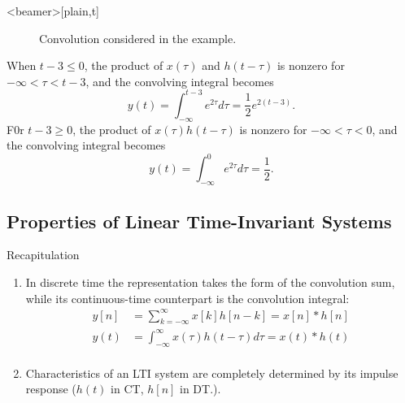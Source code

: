\begin{frame}<beamer>[plain,t]
    {
    \begin{figure}
      \centering
      
      \caption{Convolution considered in the example.}\label{fi:ct_conv_example28}
    \end{figure}
    }
\end{frame}


\begin{frame}
    When $t-3 \leq 0$, the product of $x(\tau)$ and $h(t-\tau)$ is nonzero for $-\infty < \tau < t-3$, and the convolving integral becomes
    \begin{equation*}
        y(t) = \int_{-\infty}^{t-3}e^{2\tau}d\tau = \frac{1}{2}e^{2(t-3)}.
    \end{equation*}
    F0r $t-3 \geq 0$, the product of $x(\tau)h(t-\tau)$ is nonzero for $-\infty < \tau < 0$, and the convolving integral becomes
    \begin{equation*}
        y(t) = \int_{-\infty}^{0}e^{2\tau}d\tau = \frac{1}{2}.
    \end{equation*}
\end{frame}



\subsection{Properties of Linear Time-Invariant Systems}


\begin{frame}{Recapitulation}
    \begin{enumerate}
        \item In discrete time the representation takes the form of the convolution sum, while its continuous-time counterpart is the convolution integral:
            \begin{align*}
                y[n] &= \sum_{k=-\infty}^{\infty}x[k]h[n-k] = x[n]\ast h[n]\\
                y(t) &= \int_{-\infty}^{\infty}x(\tau)h(t-\tau)d\tau = x(t)\ast h(t)\\
            \end{align*}
        \item Characteristics of an LTI system are completely determined by its impulse response ($h(t)$ in CT, $h[n]$ in DT.).
    \end{enumerate}

\end{frame}



